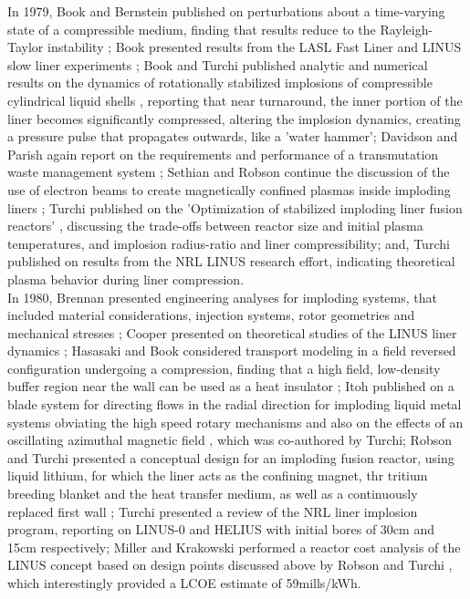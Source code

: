 In 1979, Book and Bernstein published on perturbations about a time-varying state of a compressible medium, finding that results  reduce to the Rayleigh-Taylor instability \cite{Book1979}; Book presented results from the LASL Fast Liner and LINUS slow liner experiments \cite{Book1979a}; Book and Turchi published analytic and numerical results on the dynamics of rotationally stabilized implosions of compressible cylindrical liquid shells \cite{Book1979b}, reporting that near turnaround, the inner portion of the liner becomes significantly compressed, altering the implosion dynamics, creating a pressure pulse that propagates outwards, like a 'water hammer'; Davidson and Parish again report on the requirements and performance of a transmutation waste management system \cite{Davidson1979};  Sethian and Robson continue the discussion of the use of electron beams to create magnetically confined plasmas inside imploding liners \cite{Sethian1979}; Turchi published on the 'Optimization of stabilized imploding liner fusion reactors' \cite{Turchi1979}, discussing the trade-offs between reactor size and initial plasma temperatures, and implosion radius-ratio and liner compressibility;  and, Turchi published on results from the NRL LINUS research effort, indicating theoretical plasma behavior during liner compression.\\

In 1980, Brennan presented engineering analyses for imploding systems, that included material considerations, injection systems, rotor geometries and mechanical stresses \cite{Brennan1980}; Cooper presented on theoretical studies of the LINUS liner dynamics \cite{Cooper1980}; Hasasaki and Book considered transport modeling in a field reversed configuration undergoing a compression, finding that a high field, low-density buffer region near the wall can be used as a heat insulator \cite{Hamasaki1980}; Itoh published on a blade system for directing flows in the radial direction for imploding liquid metal systems obviating the high speed rotary mechanisms \cite{Itoh1980a} and also on the effects of an oscillating azimuthal magnetic field \cite{Itoh1980b}, which was co-authored by Turchi; Robson and Turchi presented a conceptual design for an imploding fusion reactor, using liquid lithium, for which the liner acts as the confining magnet, thr tritium breeding blanket and the heat transfer medium, as well as a continuously replaced first wall \cite{Robson1980}; Turchi presented a review of the NRL liner implosion program, reporting on LINUS-0 and HELIUS with initial bores of 30cm and 15cm respectively; Miller and Krakowski performed a reactor cost analysis of the LINUS concept based on design points discussed above by Robson and Turchi \cite{Miller1980}, which interestingly provided a LCOE estimate of 59mills/kWh.\\

